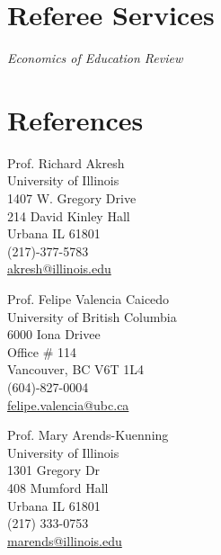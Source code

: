 \documentclass[letterpaper,11pt]{article}
\begin{document}
\section{Referee Services}
\begin{adjustwidth}{3mm}{0mm}
\textit{Economics of Education Review}
\end{adjustwidth}

\section*{References}
\begin{multicols}{3}
    \noindent
    Prof. Richard Akresh \\
    University of Illinois \\
    1407 W. Gregory Drive \\
    214 David Kinley Hall \\
    Urbana IL 61801 \\
    (217)-377-5783 \\
    \href{mailto:akresh@illinois.edu}{akresh@illinois.edu}
    \columnbreak

    \noindent
    Prof. Felipe Valencia Caicedo \\
    University of British Columbia \\
    6000 Iona Drivee \\
    Office \# 114 \\
    Vancouver, BC V6T 1L4  \\
    (604)-827-0004 \\
    \href{mailto:felipe.valencia@ubc.ca}{felipe.valencia@ubc.ca}
    \columnbreak

    \noindent
    Prof. Mary Arends-Kuenning \\
    University of Illinois \\
    1301 Gregory Dr \\
    408 Mumford Hall \\
    Urbana IL 61801 \\
    (217) 333-0753 \\
    \href{mailto:marends@illinois.edu}{marends@illinois.edu}
\end{multicols}

\clearpage
\end{document}
